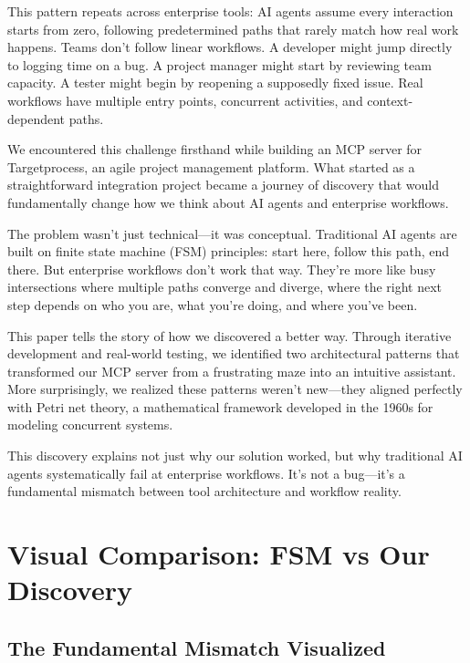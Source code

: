 \documentclass[11pt,a4paper]{article}
\begin{document}
This pattern repeats across enterprise tools: AI agents assume every interaction starts from zero, following predetermined paths that rarely match how real work happens. Teams don't follow linear workflows. A developer might jump directly to logging time on a bug. A project manager might start by reviewing team capacity. A tester might begin by reopening a supposedly fixed issue. Real workflows have multiple entry points, concurrent activities, and context-dependent paths.

We encountered this challenge firsthand while building an MCP server for Targetprocess, an agile project management platform. What started as a straightforward integration project became a journey of discovery that would fundamentally change how we think about AI agents and enterprise workflows.

The problem wasn't just technical—it was conceptual. Traditional AI agents are built on finite state machine (FSM) principles: start here, follow this path, end there. But enterprise workflows don't work that way. They're more like busy intersections where multiple paths converge and diverge, where the right next step depends on who you are, what you're doing, and where you've been.

This paper tells the story of how we discovered a better way. Through iterative development and real-world testing, we identified two architectural patterns that transformed our MCP server from a frustrating maze into an intuitive assistant. More surprisingly, we realized these patterns weren't new—they aligned perfectly with Petri net theory, a mathematical framework developed in the 1960s for modeling concurrent systems.

This discovery explains not just why our solution worked, but why traditional AI agents systematically fail at enterprise workflows. It's not a bug—it's a fundamental mismatch between tool architecture and workflow reality.

\section{Visual Comparison: FSM vs Our Discovery}

\subsection{The Fundamental Mismatch Visualized}
\end{document}
